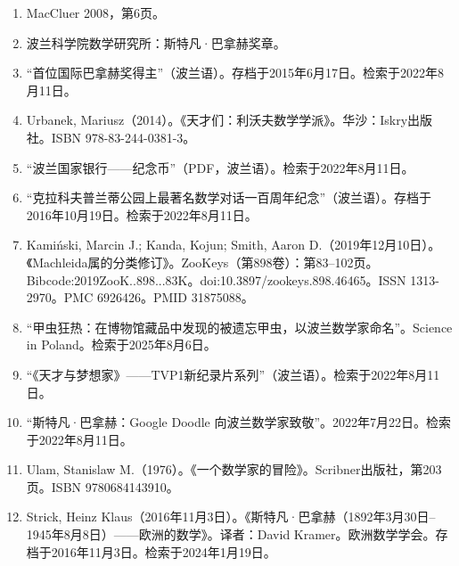 \begin{enumerate}
\item MacCluer 2008，第6页。
\item 波兰科学院数学研究所：斯特凡·巴拿赫奖章。
\item “首位国际巴拿赫奖得主”（波兰语）。存档于2015年6月17日。检索于2022年8月11日。
\item  Urbanek, Mariusz（2014）。《天才们：利沃夫数学学派》。华沙：Iskry出版社。ISBN 978-83-244-0381-3。
\item “波兰国家银行——纪念币”（PDF，波兰语）。检索于2022年8月11日。
\item “克拉科夫普兰蒂公园上最著名数学对话一百周年纪念”（波兰语）。存档于2016年10月19日。检索于2022年8月11日。
\item Kamiński, Marcin J.; Kanda, Kojun; Smith, Aaron D.（2019年12月10日）。《Machleida属的分类修订》。ZooKeys（第898卷）：第83–102页。Bibcode:2019ZooK..898...83K。doi:10.3897/zookeys.898.46465。ISSN 1313-2970。PMC 6926426。PMID 31875088。
\item “甲虫狂热：在博物馆藏品中发现的被遗忘甲虫，以波兰数学家命名”。Science in Poland。检索于2025年8月6日。
\item “《天才与梦想家》——TVP1新纪录片系列”（波兰语）。检索于2022年8月11日。
\item “斯特凡·巴拿赫：Google Doodle 向波兰数学家致敬”。2022年7月22日。检索于2022年8月11日。
\item  Ulam, Stanislaw M.（1976）。《一个数学家的冒险》。Scribner出版社，第203页。ISBN 9780684143910。
\item Strick, Heinz Klaus（2016年11月3日）。《斯特凡·巴拿赫（1892年3月30日–1945年8月8日）——欧洲的数学》。译者：David Kramer。欧洲数学学会。存档于2016年11月3日。检索于2024年1月19日。
\end{enumerate}
